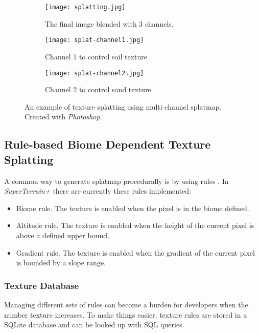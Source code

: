 \documentclass[oneside, a4paper]{report}
\begin{document}
    \begin{figure}[H]
        \center
        \begin{subfigure}{0.3\textwidth}
            \texttt{[image: splatting.jpg]}
            \caption{The final image blended with 3 channels.}
        \end{subfigure}
        \begin{subfigure}{0.3\textwidth}
            \texttt{[image: splat-channel1.jpg]}
            \caption{Channel 1 to control soil texture}
        \end{subfigure}
        \begin{subfigure}{0.3\textwidth}
            \texttt{[image: splat-channel2.jpg]}
            \caption{Channel 2 to control sand texture}
        \end{subfigure}
        \caption{An example of texture splatting using multi-channel splatmap. Created with \textit{Photoshop}.}
    \end{figure}

    \subsection{Rule-based Biome Dependent Texture Splatting}

    A common way to generate splatmap procedurally is by using rules \cite{rule_splatting}. In \textit{SuperTerrain+} there are currently these rules implemented:

    \begin{itemize}[label=\(\diamond\)]
        \item Biome rule. The texture is enabled when the pixel is in the biome defined.
        \item Altitude rule. The texture is enabled when the height of the current pixel is above a defined upper bound.
        \item Gradient rule. The texture is enabled when the gradient of the current pixel is bounded by a slope range.
    \end{itemize}

    \subsubsection{Texture Database}
    \label{sec:texture_db}

    Managing different sets of rules can become a burden for developers when the number texture increases. To make things easier, texture rules are stored in a SQLite database and can be looked up with SQL queries.
\end{document}
